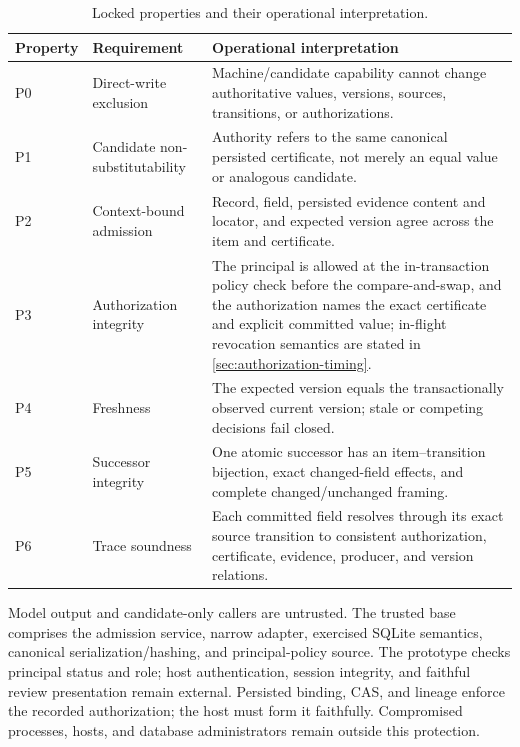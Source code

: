 \begin{table}[t]
\centering
\caption{Locked properties and their operational interpretation.}
\label{tab:properties}
\begin{tabularx}{\textwidth}{@{}l>{\raggedright\arraybackslash}p{}>{\raggedright\arraybackslash}X@{}}
\toprule
Property & Requirement & Operational interpretation \\
\midrule
P0 & Direct-write exclusion & Machine/candidate capability cannot change authoritative values, versions, sources, transitions, or authorizations. \\
P1 & Candidate non-substitutability & Authority refers to the same canonical persisted certificate, not merely an equal value or analogous candidate. \\
P2 & Context-bound admission & Record, field, persisted evidence content and locator, and expected version agree across the item and certificate. \\
P3 & Authorization integrity & The principal is allowed at the in-transaction policy check before the compare-and-swap, and the authorization names the exact certificate and explicit committed value; in-flight revocation semantics are stated in \cref{sec:authorization-timing}. \\
P4 & Freshness & The expected version equals the transactionally observed current version; stale or competing decisions fail closed. \\
P5 & Successor integrity & One atomic successor has an item--transition bijection, exact changed-field effects, and complete changed/unchanged framing. \\
P6 & Trace soundness & Each committed field resolves through its exact source transition to consistent authorization, certificate, evidence, producer, and version relations. \\
\bottomrule
\end{tabularx}
\end{table}

Model output and candidate-only callers are untrusted. The trusted base comprises the admission service, narrow adapter, exercised SQLite semantics, canonical serialization/hashing, and principal-policy source. The prototype checks principal status and role; host authentication, session integrity, and faithful review presentation remain external. Persisted binding, CAS, and lineage enforce the recorded authorization; the host must form it faithfully. Compromised processes, hosts, and database administrators remain outside this protection.

